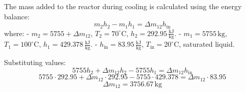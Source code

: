 The mass added to the reactor during cooling is calculated using the energy balance:  
\[
m_2 h_2 - m_1 h_1 = \Delta m_{12} h_{\text{in}}
\]  
where:  
- \( m_2 = 5755 + \Delta m_{12} \), \( T_2 = 70^\circ\text{C} \), \( h_2 = 292.95 \, \frac{\text{kJ}}{\text{kg}} \).  
- \( m_1 = 5755 \, \text{kg} \), \( T_1 = 100^\circ\text{C} \), \( h_1 = 429.378 \, \frac{\text{kJ}}{\text{kg}} \).  
- \( h_{\text{in}} = 83.95 \, \frac{\text{kJ}}{\text{kg}} \), \( T_{\text{in}} = 20^\circ\text{C} \), saturated liquid.  

Substituting values:  
\[
5755 h_2 + \Delta m_{12} h_2 - 5755 h_1 = \Delta m_{12} h_{\text{in}}
\]  
\[
5755 \cdot 292.95 + \Delta m_{12} \cdot 292.95 - 5755 \cdot 429.378 = \Delta m_{12} \cdot 83.95
\]  
\[
\Delta m_{12} = 3756.67 \, \text{kg}
\]